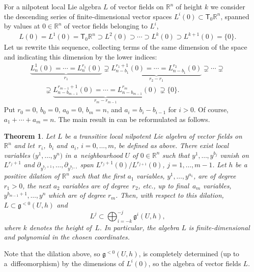 \documentclass[pdftex]{sigma}
\numberwithin{equation}{section}
\newtheorem{Theorem}{Theorem}[section]
\begin{document}
For a nilpotent local Lie algebra $L$ of vector fields on ${\mathbb R}^n$ of height $k$ we consider the descending series of finite-dimensional vector spaces $L^i(0)\subset{\mathsf T}_0{\mathbb R}^n$, spanned by values at $0\in{\mathbb R}^n$ of vector fields belonging to $L^i$,
\begin{gather*}%
L(0)=L^1(0)={\mathsf T}_0{\mathbb R}^n\supset L^2(0)\supset \cdots\supset L^{k}(0)\supset L^{k+1}(0)=\{ 0\} .
\end{gather*}
Let us rewrite this sequence, collecting terms of the same dimension of the space and indicating this dimension by the lower indices:
\begin{gather*}
 \underbrace{L^1_n(0)=\cdots= L^{r_1}_n(0)}_{r_1}\supsetneq
\underbrace{L^{r_1+1}_{n-b_1}(0)=\cdots= L^{r_2}_{n-b_1}(0)}_{r_2-r_1}\supsetneq
\cdots\supsetneq\\
\qquad{} \supsetneq\underbrace{L^{r_{m-1}+1}_{n-b_{m-1}}(0)=\cdots= L^{r_m}_{n-b_{m-1}}(0)}_{r_m-r_{m-1}}
\supsetneq \{ 0\} .
\end{gather*}
Put $r_0=0$, $b_0=0$, $a_0=0$, $b_m=n$, and $a_i=b_i-b_{i-1}$ for $i>0$. Of course, $a_1+\cdots+a_m=n$.
The main result in \cite{JG90} can be reformulated as follows.
\begin{Theorem}\label{nil}
Let $L$ be a transitive local nilpotent Lie algebra of vector fields on ${\mathbb R}^n$ and let~$r_i$,~$b_i$ and~$a_i$, $i=0,\dots,m$, be defined as above. There exist local variables $\big(y^1,\dots,y^n\big)$ in a~neighbourhood $U$ of $0\in{\mathbb R}^n$ such that $y^1,\dots, y^{b_j}$ vanish on $L^{r_j+1}$ and $\partial_{y^{b_j+1}},\dots,\partial_{y^{b_{j+1}}}$ span $L^{r_{j}+1}(0)/L^{r_{j+1}}(0)$, $j=1,\dots,m-1$. Let $h$ be a positive dilation of ${\mathbb R}^n$ such that the first $a_1$ variables, $y^1,\dots,y^{a_1}$, are of degree $r_1>0$, the next $a_2$ variables are of degree~$r_2$, etc., up to final~$a_m$ variables, $y^{b_{m-1}+1},\dots,y^n$ which are of degree $r_{m}$.
Then, with respect to this dilation, $L\subset\mathfrak{g}^{<0}(U,h)$ and
\[ L^j\subset \bigoplus_{i=-k}^{-j}\mathfrak{g}^i(U,h) ,\]
where $k$ denotes the height of~$L$.
In particular, the algebra $L$ is finite-dimensional and polynomial in the chosen coordinates.
\end{Theorem}
\begin{Remark}
Note that the dilation above, so $\mathfrak{g}^{<0}(U,h)$, is completely determined (up to a~diffeomorphism) by the dimensions of $L^i(0)$, so the algebra of vector fields $L$.
\end{Remark}
\end{document}
